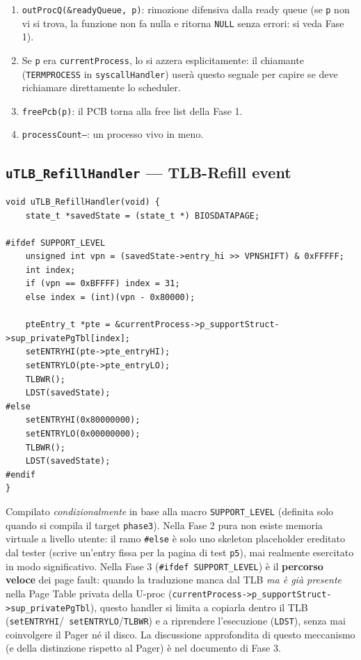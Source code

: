 \documentclass[11pt,a4paper]{article}
\newcommand{\code}[1]{\texttt{#1}}
\newcommand{\func}[1]{\textbf{\texttt{#1}}}
\begin{document}
\begin{enumerate}
\begin{itemize}
    altrimenti il suo valore resterebbe sbilanciato verso il basso e un
    futuro processo che tenta la \code{P} si bloccherebbe per sempre
    aspettando un rilascio che non arriverà mai (il processo che avrebbe
    dovuto fare la V corrispondente non esiste più).
  \end{itemize}
\item \code{outProcQ(\&readyQueue, p)}: rimozione difensiva dalla ready
  queue (se \code{p} non vi si trova, la funzione non fa nulla e ritorna
  \code{NULL} senza errori: si veda Fase 1).
\item Se \code{p} era \code{currentProcess}, lo si azzera esplicitamente:
  il chiamante (\code{TERMPROCESS} in \code{syscallHandler}) userà questo
  segnale per capire se deve richiamare direttamente lo scheduler.
\item \code{freePcb(p)}: il PCB torna alla free list della Fase 1.
\item \code{processCount--}: un processo vivo in meno.
\end{enumerate}

\subsection{\func{uTLB\_RefillHandler} --- TLB-Refill event}
\begin{lstlisting}
void uTLB_RefillHandler(void) {
    state_t *savedState = (state_t *) BIOSDATAPAGE;

#ifdef SUPPORT_LEVEL
    unsigned int vpn = (savedState->entry_hi >> VPNSHIFT) & 0xFFFFF;
    int index;
    if (vpn == 0xBFFFF) index = 31;
    else index = (int)(vpn - 0x80000);

    pteEntry_t *pte = &currentProcess->p_supportStruct->sup_privatePgTbl[index];
    setENTRYHI(pte->pte_entryHI);
    setENTRYLO(pte->pte_entryLO);
    TLBWR();
    LDST(savedState);
#else
    setENTRYHI(0x80000000);
    setENTRYLO(0x00000000);
    TLBWR();
    LDST(savedState);
#endif
}
\end{lstlisting}
Compilato \emph{condizionalmente} in base alla macro \code{SUPPORT\_LEVEL}
(definita solo quando si compila il target \code{phase3}). Nella Fase 2
pura non esiste memoria virtuale a livello utente: il ramo \code{\#else} è
solo uno skeleton placeholder ereditato dal tester (scrive
un'entry fissa per la pagina di test \code{p5}), mai realmente esercitato
in modo significativo. Nella Fase 3 (\code{\#ifdef SUPPORT\_LEVEL}) è il
\textbf{percorso veloce} dei page fault: quando la traduzione manca dal TLB
\emph{ma è già presente} nella Page Table privata della U-proc
(\code{currentProcess->p\_supportStruct->sup\_privatePgTbl}), questo
handler si limita a copiarla dentro il TLB (\code{setENTRYHI}/\code{
setENTRYLO}/\code{TLBWR}) e a riprendere l'esecuzione (\code{LDST}), senza
mai coinvolgere il Pager né il disco. La discussione approfondita di questo
meccanismo (e della distinzione rispetto al Pager) è nel documento di Fase
3.
\end{document}
